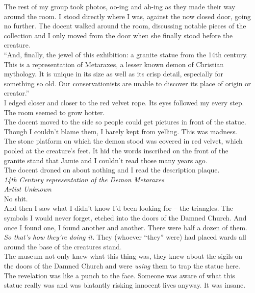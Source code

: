 \documentclass[a5paper]{scrartcl}
\begin{document}
The rest of my group took photos, oo-ing and ah-ing as they made their way around the room. I stood directly where I was, against the now closed door, going no further. The docent walked around the room, discussing notable pieces of the collection and I only moved from the door when she finally stood before the creature.\\


\enquote{And, finally, the jewel of this exhibition: a granite statue from the 14th century. This is a representation of Metaraxes, a lesser known demon of Christian mythology. It is unique in its size as well as its crisp detail, especially for something so old. Our conservationists are unable to discover its place of origin or creator.}\\


I edged closer and closer to the red velvet rope. Its eyes followed my every step. The room seemed to grow hotter. \\


The docent moved to the side so people could get pictures in front of the statue. Though I couldn't blame them, I barely kept from yelling. This was madness.\\


The stone platform on which the demon stood was covered in red velvet, which pooled at the creature's feet. It hid the words inscribed on the front of the granite stand that Jamie and I couldn't read those many years ago.\\


The docent droned on about nothing and I read the description plaque.\\


\textit{14th Century representation of the Demon Metaraxes}
\\


\textit{Artist Unknown}
\\


No shit.\\


And then I saw what I didn't know I'd been looking for -- the triangles. The symbols I would never forget, etched into the doors of the Damned Church. And once I found one, I found another and another. There were half a dozen of them. \textit{So that's how they're doing it.}
 They (whoever \enquote{they} were) had placed wards all around the base of the creatures stand. \\


The museum not only knew what this thing was, they knew about the sigils on the doors of the Damned Church and were \textit{using}
 them to trap the statue here. The revelation was like a punch to the face. Someone was aware of what this statue really was and was blatantly risking innocent lives anyway. It was insane.\\
\end{document}
